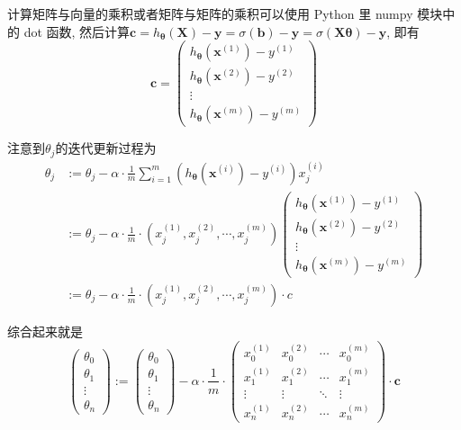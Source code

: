 \documentclass[a4paper,UTF8]{ctexart}
\theoremstyle{plain} \newtheorem{theorem}{定理}[section]
\theoremstyle{plain} \newtheorem{definition}{定义}[section]
\theoremstyle{plain} \newtheorem{lemma}{引理}[section]
\theoremstyle{plain} \newtheorem{proposition}{命题}[section]
\theoremstyle{plain} \newtheorem{example}{例}[section]
\theoremstyle{plain} \newtheorem{remark}{注}[section]
\theoremstyle{plain} \newtheorem{corollary}{推论}[section]
\begin{document}
计算矩阵与向量的乘积或者矩阵与矩阵的乘积可以使用 Python 里 numpy 模块中的 dot 函数, 然后计算$\bm{c} = h_{\bm{\theta}}(\bm{X}) - \bm{y} = \sigma(\bm{b}) - \bm{y} = \sigma(\bm{X \theta}) - \bm{y}$, 即有
$$
\bm{c} =
\begin{pmatrix}
h_{\bm{\theta}}(\bm{x}^{(1)}) - y^{(1)} \\
h_{\bm{\theta}}(\bm{x}^{(2)}) - y^{(2)} \\
\vdots \\
h_{\bm{\theta}}(\bm{x}^{(m)}) - y^{(m)}
\end{pmatrix}
$$

注意到$\theta_{j}$的迭代更新过程为
\begin{align*}
\theta_{j} & := \theta_{j} - \alpha \cdot \frac{1}{m} \sum_{i=1}^{m} (h_{\bm{\theta}}(\bm{x}^{(i)}) - y^{(i)})x_{j}^{(i)} \\
& := \theta_{j} - \alpha \cdot \frac{1}{m} \cdot (x_{j}^{(1)}, x_{j}^{(2)}, \cdots, x_{j}^{(m)}) 
\begin{pmatrix}
h_{\bm{\theta}}(\bm{x}^{(1)}) - y^{(1)} \\
h_{\bm{\theta}}(\bm{x}^{(2)}) - y^{(2)} \\
\vdots \\
h_{\bm{\theta}}(\bm{x}^{(m)}) - y^{(m)}
\end{pmatrix} \\
& := \theta_{j} - \alpha \cdot \frac{1}{m} \cdot (x_{j}^{(1)}, x_{j}^{(2)}, \cdots, x_{j}^{(m)}) \cdot c
\end{align*}

综合起来就是
$$
\begin{pmatrix}
\theta_{0} \\
\theta_{1} \\
\vdots     \\
\theta_{n}
\end{pmatrix}
:=
\begin{pmatrix}
\theta_{0} \\
\theta_{1} \\
\vdots     \\
\theta_{n}
\end{pmatrix}
- \alpha \cdot \frac{1}{m} \cdot
\begin{pmatrix}
x_{0}^{(1)}  & x_{0}^{(2)}  & \cdots  &  x_{0}^{(m)} \\
x_{1}^{(1)}  & x_{1}^{(2)}  & \cdots  &  x_{1}^{(m)} \\
\vdots       & \vdots       & \ddots  &  \vdots \\
x_{n}^{(1)}  & x_{n}^{(2)}  & \cdots  &  x_{n}^{(m)}
\end{pmatrix}
\cdot \bm{c}
$$
\end{document}
